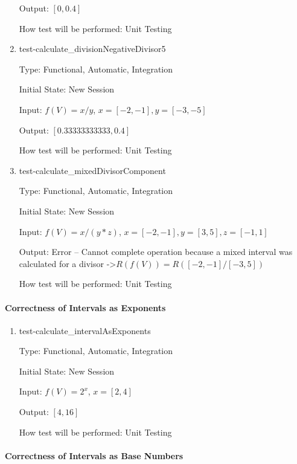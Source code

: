 \documentclass[12pt, titlepage]{article}
\begin{document}
\begin{enumerate}
	Output: $[0,0.4]$
	
	How test will be performed: Unit Testing\\
	
	\item{test-calculate\_divisionNegativeDivisor5}
	
	Type: Functional, Automatic, Integration
	
	Initial State: New Session
	
	Input: $f(V) = x / y$, $x = [-2,-1], y = [-3,-5]$
	
	Output: $[0.33333333333,0.4]$
	
	How test will be performed: Unit Testing\\
	
	\item{test-calculate\_mixedDivisorComponent}
	
	Type: Functional, Automatic, Integration
	
	Initial State: New Session
	
	Input: $f(V) = x / (y * z)$, $x = [-2,-1], y = [3,5], z = [-1,1]$
	
	Output: Error -- Cannot complete operation because a mixed interval was 
	calculated for a divisor -\textgreater $R(f(V)) = R([-2,-1] / [-3,5])$
	
	How test will be performed: Unit Testing\\
	
\end{enumerate}

\paragraph{Correctness of Intervals as Exponents}

\begin{enumerate}
	
	\item{test-calculate\_intervalAsExponents}
	
	Type: Functional, Automatic, Integration
	
	Initial State: New Session
	
	Input: $f(V) = 2^x$, $x = [2,4]$
	
	Output: $[4,16]$
	
	How test will be performed: Unit Testing\\
	
\end{enumerate}

\paragraph{Correctness of Intervals as Base Numbers}
\end{document}
